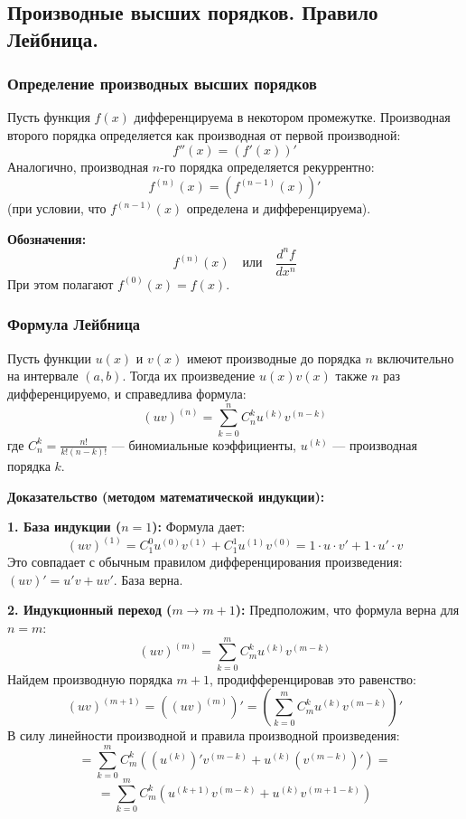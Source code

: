 \subsection{Производные высших порядков. Правило Лейбница.}

\subsubsection*{Определение производных высших порядков}

Пусть функция $f(x)$ дифференцируема в некотором промежутке.
Производная второго порядка определяется как производная от первой производной:
\[ f''(x) = (f'(x))' \]
Аналогично, производная $n$-го порядка определяется рекуррентно:
\[ f^{(n)}(x) = \left( f^{(n-1)}(x) \right)' \]
(при условии, что $f^{(n-1)}(x)$ определена и дифференцируема).

\textbf{Обозначения:}
\[ f^{(n)}(x) \quad \text{или} \quad \frac{d^n f}{dx^n} \]
При этом полагают $f^{(0)}(x) = f(x)$.

\subsubsection*{Формула Лейбница}

\begin{tcolorbox}[title=Теорема (Правило Лейбница)]
    Пусть функции $u(x)$ и $v(x)$ имеют производные до порядка $n$ включительно на интервале $(a, b)$.
    Тогда их произведение $u(x)v(x)$ также $n$ раз дифференцируемо, и справедлива формула:
    \[ (uv)^{(n)} = \sum_{k=0}^n C_n^k u^{(k)} v^{(n-k)} \]
    где $C_n^k = \frac{n!}{k!(n-k)!}$ — биномиальные коэффициенты, $u^{(k)}$ — производная порядка $k$.
\end{tcolorbox}

\textbf{Доказательство (методом математической индукции):}

\textbf{1. База индукции ($n=1$):}
Формула дает:
\[ (uv)^{(1)} = C_1^0 u^{(0)}v^{(1)} + C_1^1 u^{(1)}v^{(0)} = 1 \cdot u \cdot v' + 1 \cdot u' \cdot v \]
Это совпадает с обычным правилом дифференцирования произведения: $(uv)' = u'v + uv'$. База верна.

\textbf{2. Индукционный переход ($m \to m+1$):}
Предположим, что формула верна для $n=m$:
\[ (uv)^{(m)} = \sum_{k=0}^m C_m^k u^{(k)} v^{(m-k)} \]
Найдем производную порядка $m+1$, продифференцировав это равенство:
\[ (uv)^{(m+1)} = \left( (uv)^{(m)} \right)' = \left( \sum_{k=0}^m C_m^k u^{(k)} v^{(m-k)} \right)' \]
В силу линейности производной и правила производной произведения:
\[ = \sum_{k=0}^m C_m^k \left( (u^{(k)})' v^{(m-k)} + u^{(k)} (v^{(m-k)})' \right) = \]
\[ = \sum_{k=0}^m C_m^k \left( u^{(k+1)} v^{(m-k)} + u^{(k)} v^{(m+1-k)} \right) \]

